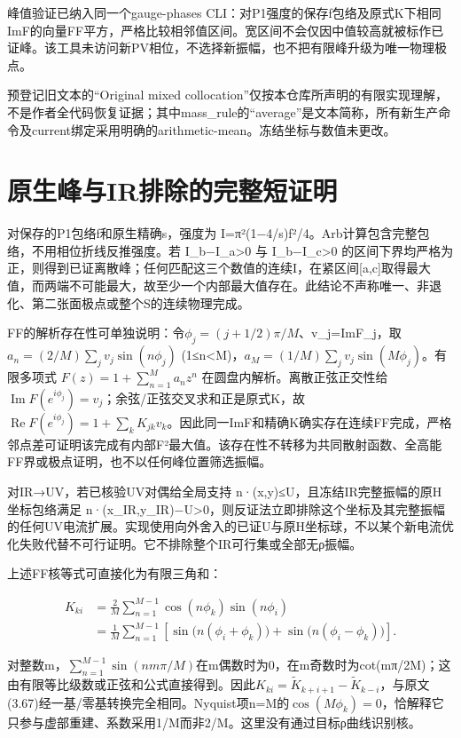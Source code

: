 \documentclass[
  10pt,
  a4paper,
]{article}
\begin{document}
峰值验证已纳入同一个gauge-phases
CLI：对P1强度的保存f包络及原式K下相同ImF的向量FF平方，严格比较相邻值区间。宽区间不会仅因中值较高就被标作已证峰。该工具未访问新PV相位，不选择新振幅，也不把有限峰升级为唯一物理极点。

预登记旧文本的``Original mixed
collocation''仅按本仓库所声明的有限实现理解，不是作者全代码恢复证据；其中mass\_rule的``average''是文本简称，所有新生产命令及current绑定采用明确的arithmetic-mean。冻结坐标与数值未更改。

\section{原生峰与IR排除的完整短证明}\label{ux539fux751fux5cf0ux4e0eirux6392ux9664ux7684ux5b8cux6574ux77edux8bc1ux660e}

对保存的P1包络f和原生精确s，强度为
I=π²(1−4/s)\textbar f\textbar²/4。Arb计算包含完整包络，不用相位折线反推强度。若
I\_b−I\_a\textgreater0 与 I\_b−I\_c\textgreater0
的区间下界均严格为正，则得到已证离散峰；任何匹配这三个数值的连续I，在紧区间{[}a,c{]}取得最大值，而两端不可能最大，故至少一个内部最大值存在。此结论不声称唯一、非退化、第二张面极点或整个S的连续物理完成。

FF的解析存在性可单独说明：令\(\phi_j=(j+1/2)\pi/M\)、v\_j=ImF\_j，取
\(a_n=(2/M)\sum_j v_j\sin(n\phi_j)\)
(1≤n\textless M)，\(a_M=(1/M)\sum_j v_j\sin(M\phi_j)\)。有限多项式
\(F(z)=1+\sum_{n=1}^M a_n z^n\)
在圆盘内解析。离散正弦正交性给\(\operatorname{Im}F(e^{i\phi_j})=v_j\)；余弦/正弦交叉求和正是原式K，故\(\operatorname{Re}F(e^{i\phi_j})=1+\sum_k K_{jk}v_k\)。因此同一ImF和精确K确实存在连续FF完成，严格邻点差可证明该完成有内部\textbar F\textbar²最大值。该存在性不转移为共同散射函数、全高能FF界或极点证明，也不以任何峰位置筛选振幅。

对IR→UV，若已核验UV对偶给全局支持
n·(x,y)≤U，且冻结IR完整振幅的原H坐标包络满足
n·(x\_IR,y\_IR)−U\textgreater0，则反证法立即排除这个坐标及其完整振幅的任何UV电流扩展。实现使用向外舍入的已证U与原H坐标球，不以某个新电流优化失败代替不可行证明。它不排除整个IR可行集或全部无ρ振幅。

上述FF核等式可直接化为有限三角和：

\[
\begin{aligned}
K_{ki}&=\frac{2}{M}\sum_{n=1}^{M-1}\cos(n\phi_k)\sin(n\phi_i)\\
&=\frac{1}{M}\sum_{n=1}^{M-1}\left[\sin\bigl(n(\phi_i+\phi_k)\bigr)+\sin\bigl(n(\phi_i-\phi_k)\bigr)\right].
\end{aligned}
\]

对整数m，\(\sum_{n=1}^{M-1}\sin(nm\pi/M)\)在m偶数时为0，在m奇数时为cot(mπ/2M)；这由有限等比级数或正弦和公式直接得到。因此\(K_{ki}=\widetilde K_{k+i+1}-\widetilde K_{k-i}\)，与原文(3.67)经一基/零基转换完全相同。Nyquist项n=M的\(\cos(M\phi_k)=0\)，恰解释它只参与虚部重建、系数采用1/M而非2/M。这里没有通过目标ρ曲线识别核。
\end{document}
